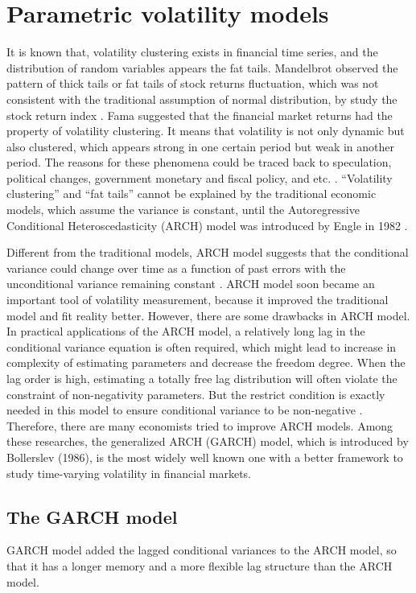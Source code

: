 \chapter{Parametric volatility models}\label{secGarchmodel}
It is known that, volatility clustering exists in financial time series, and the distribution of random variables appears the fat tails. Mandelbrot observed the pattern of thick tails or fat tails of stock returns fluctuation, which was not consistent with the traditional assumption of normal distribution, by study the stock return index \citep{Mandelbrot1963}. 
Fama suggested that the financial market returns had the property of volatility clustering. It means that volatility is not only dynamic but also clustered, which appears strong in one certain period but weak in another period. The reasons for these phenomena could be traced back to speculation, political changes, government monetary and fiscal policy, and etc. \citep{EugeneF.Fama1965}. ``Volatility clustering'' and ``fat tails'' cannot be explained by the traditional economic models, which assume the variance is constant, until the Autoregressive Conditional Heteroscedasticity (ARCH) model was introduced by Engle in 1982 \citep{Bollerslev1992}.


Different from the traditional models, ARCH model suggests that the conditional variance could change over time as a function of past errors with the unconditional variance remaining constant \citep{Engle1982}. ARCH model soon became an important tool of volatility measurement, because it improved the traditional model and fit reality better. However, there are some drawbacks in ARCH model. In practical applications of the ARCH model, a relatively long lag in the conditional variance equation is often required, which might lead to increase in complexity of estimating parameters and decrease the freedom degree. When the lag order is high, estimating a totally free lag distribution will often violate the constraint of non-negativity parameters. But the restrict condition is exactly needed in this model to ensure conditional variance to be non-negative \citep{Bollerslev1986}. Therefore, there are many economists tried to improve ARCH models. Among these researches, the generalized ARCH (GARCH) model, which is introduced by Bollerslev (1986), is the most widely well known one with a better framework to study time-varying volatility in financial markets. 

\section{The GARCH model}
GARCH model added the lagged conditional variances to the ARCH model, so that it has a longer memory and a more flexible lag structure than the ARCH model.

